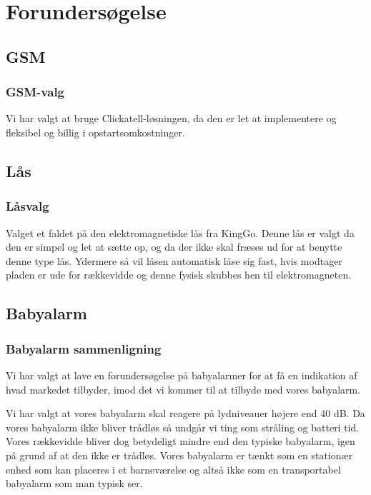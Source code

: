 \chapter{Forundersøgelse}

\section{GSM}

\subsection{GSM-valg}
Vi har valgt at bruge Clickatell-løsningen, da den er let at implementere og fleksibel og billig i opstartsomkostninger.

\newpage
\section{Lås}

\subsection{Låsvalg}
Valget et faldet på den elektromagnetiske lås fra KingGo. Denne lås er valgt da den er simpel og let at sætte op, og da der ikke skal fræses ud for at benytte denne type lås. Ydermere så vil låsen automatisk låse sig fast, hvis modtager pladen er ude for rækkevidde og denne fysisk skubbes hen til elektromagneten.

\newpage
\section{Babyalarm}

\subsection{Babyalarm sammenligning}
Vi har valgt at lave en forundersøgelse på babyalarmer for at få en indikation af hvad markedet tilbyder, imod det vi kommer til at tilbyde med vores babyalarm.

Vi har valgt at vores babyalarm skal reagere på lydniveauer højere end 40 dB. Da vores babyalarm ikke bliver trådløs så undgår vi ting som stråling og batteri tid. Vores rækkevidde bliver dog betydeligt mindre end den typiske babyalarm, igen på grund af at den ikke er trådløs. Vores babyalarm er tænkt som en stationær enhed som kan placeres i et barneværelse og altså ikke som en transportabel babyalarm som man typisk ser.

